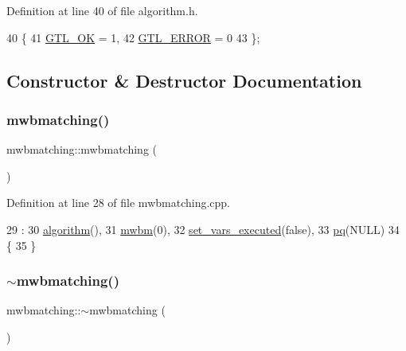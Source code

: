 Definition at line 40 of file algorithm.\+h.


\begin{DoxyCode}
40          \{
41     \mbox{\hyperlink{classalgorithm_af1a0078e153aa99c24f9bdf0d97f6710a5114c20e4a96a76b5de9f28bf15e282b}{GTL\_OK}} = 1,
42     \mbox{\hyperlink{classalgorithm_af1a0078e153aa99c24f9bdf0d97f6710a6fcf574690bbd6cf710837a169510dd7}{GTL\_ERROR}} = 0
43     \};
\end{DoxyCode}


\subsection{Constructor \& Destructor Documentation}
\mbox{\label{classmwbmatching_a360da276965377cb3e97461e2d207537}} 
\subsubsection{\texorpdfstring{mwbmatching()}{mwbmatching()}}
{\footnotesize\ttfamily mwbmatching\+::mwbmatching (\begin{DoxyParamCaption}{ }\end{DoxyParamCaption})}



Definition at line 28 of file mwbmatching.\+cpp.


\begin{DoxyCode}
29     :
30       \mbox{\hyperlink{classalgorithm_ab79e1ddec2f2afdf4b36b10724db8b15}{algorithm}}(),
31       \mbox{\hyperlink{classmwbmatching_a80e73b4ab7162ea265c48a93199fc172}{mwbm}}(0),
32       \mbox{\hyperlink{classmwbmatching_ae871c52302b78ccf16a271ef099e0a3a}{set\_vars\_executed}}(\textcolor{keyword}{false}),
33       \mbox{\hyperlink{classmwbmatching_adeeeb1d1bc49ead5bce740bde6ae52bf}{pq}}(NULL)
34 \{
35 \}
\end{DoxyCode}
\mbox{\label{classmwbmatching_a93190f5d39643b3b8a3067a07abd520b}} 
\subsubsection{\texorpdfstring{$\sim$mwbmatching()}{~mwbmatching()}}
{\footnotesize\ttfamily mwbmatching\+::$\sim$mwbmatching (\begin{DoxyParamCaption}{ }\end{DoxyParamCaption})\hspace{0.3cm}{\ttfamily [virtual]}}



